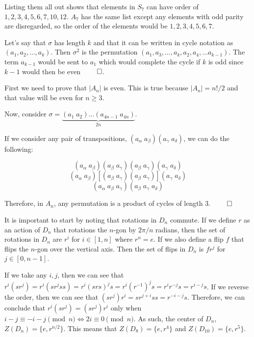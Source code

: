 \documentclass[12pt]{report}
\begin{document}
Listing them all out shows that elements in $S_7$ can have order of $1, 2, 3, 4, 5, 6, 7, 10, 12$. $A_7$ has the same list except any elements with odd parity are disregarded, so the order of the elements would be $1, 2, 3, 4, 5, 6, 7$. 

\sol Let's say that $\sigma$ has length $k$ and that it can be written in cycle notation as $(a_1, a_2, \ldots, a_k)$. Then $\sigma^2$ is the permutation $(a_1, a_3, \ldots, a_k, a_2, a_4, \ldots a_{k-1})$. The term $a_{k-1}$ would be sent to $a_1$ which would complete the cycle if $k$ is odd since $k-1$ would then be even $\qed$. 

\sol First we need to prove that $|A_n|$ is even. This is true because $|A_n| = n!/2$ and that value will be even for $n \geq 3$. 

Now, consider $\sigma=\underbrace{(a_1 \; a_2)\dots(a_{4n-1} \; a_{4n})}_{2n}$. 

If we consider any pair of transpositions, $(a_\alpha \; a_\beta)(a_\gamma \; a_\delta)$, we can do the following:

$$(a_\alpha \; a_\beta)(a_\beta \; a_\gamma)(a_\beta \; a_\gamma)(a_\gamma \; a_\delta)$$
$$(a_\alpha \; a_\beta)[(a_\beta \; a_\gamma)(a_\beta \; a_\gamma)](a_\gamma \; a_\delta)$$
$$(a_\alpha \; a_\beta \; a_\gamma)(a_\beta \; a_\gamma \; a_\delta)$$

Therefore, in $A_n$, any permutation is a product of cycles of length $3$. $\qed$

\sol It is important to start by noting that rotations in $D_n$ commute. If we define $r$ as an action of $D_n$ that rotations the $n$-gon by $2\pi/n$ radians, then the set of rotations in $D_n$ are $r^i$ for $i \in [1, n]$ where $r^n = e$. If we also define a flip $f$ that flips the $n$-gon over the vertical axis. Then the set of flips in $D_n$ is $fr^j$ for $j \in [0, n-1]$.

If we take any $i,j$, then we can see that $r^i(sr^j) = r^i(sr^jss) = r^i(srs)^js = r^i(r^{-1})^js = r^ir^{-j}s = r^{i-j}s$. If we reverse the order, then we can see that $(sr^j)r^i = sr^{j+i}ss = r^{-i-j}s$. Therefore, we can conclude that $r^i(sr^j) = (sr^j)r^i$  only when $i - j \equiv -i-j \pmod{n} \Longleftrightarrow 2i \equiv 0 \pmod{n}$. As such, the center of $D_n$, $Z(D_n) = \{e, r^{n/2}\}$. This means that $Z(D_8) = \{e, r^4\}$ and $Z(D_{10}) = \{e, r^5\}$.
\end{document}
